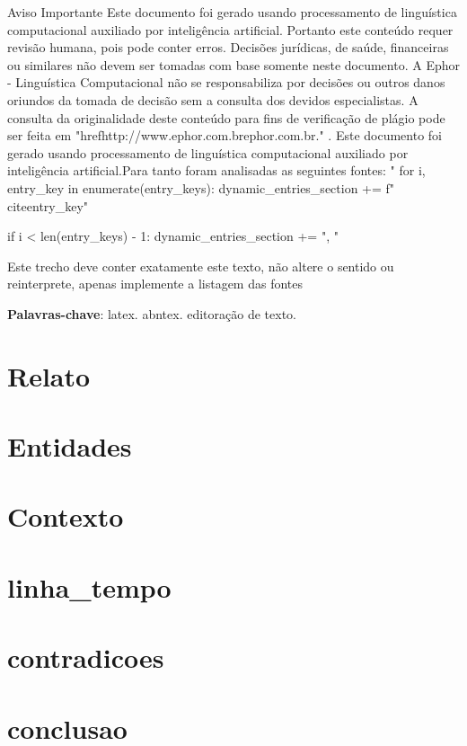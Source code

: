 \documentclass[
	article,			
	11pt,				
	oneside,			
	a4paper,			
	english,			
	brazil,				
	sumario=tradicional
	]{abntex2}
\begin{document}

\frenchspacing 

\maketitle


\begin{resumoumacoluna}
         
            Aviso Importante
            Este documento foi gerado usando processamento de linguística computacional auxiliado por inteligência artificial. Portanto este conteúdo requer revisão humana, pois pode conter erros. Decisões jurídicas, de saúde, financeiras ou similares não devem ser tomadas com base somente neste documento. A Ephor - Linguística Computacional não se responsabiliza por decisões ou outros danos oriundos da tomada de decisão sem a consulta dos devidos especialistas. A consulta da originalidade deste conteúdo para fins de verificação de plágio pode ser feita em "href{http://www.ephor.com.br}{ephor.com.br}.\n" .  Este documento foi gerado usando processamento de linguística computacional auxiliado por inteligência artificial.Para tanto foram analisadas as seguintes fontes:  "            for i, entry_key in enumerate(entry_keys):
                dynamic_entries_section += f"\\cite{{{entry_key}}}"

                if i < len(entry_keys) - 1:
                    dynamic_entries_section += ", "

Este trecho deve conter exatamente este texto, não altere o sentido ou reinterprete, apenas implemente a listagem das fontes
 \vspace{\onelineskip}
 
 \noindent
 \textbf{Palavras-chave}: latex. abntex. editoração de texto.
\end{resumoumacoluna}



\textual
\section{Relato}
\section{Entidades}
\section{Contexto}
\section{linha_tempo}
\section{contradicoes}
\section{conclusao}
\postextual


\end{document}
